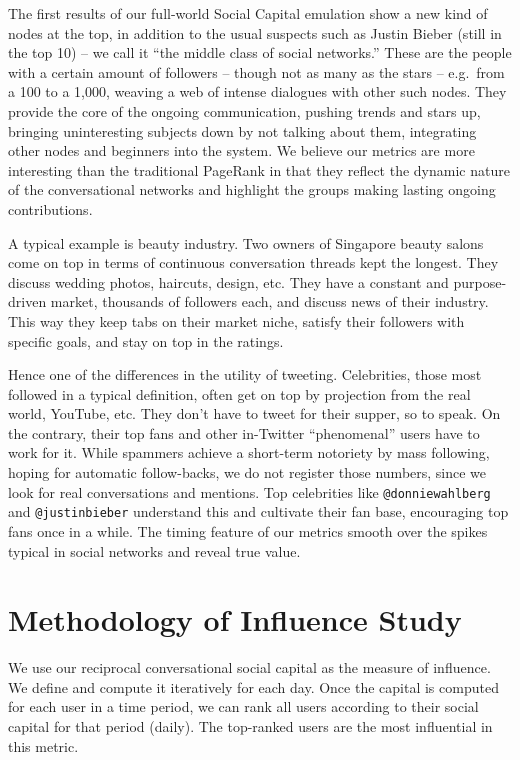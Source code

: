 \documentclass[10pt,oneside]{memoir}
\begin{document}
The first results of our full-world Social Capital emulation show a new kind of nodes at the top, in addition to the usual suspects such as Justin Bieber (still in the top 10) -- we call it ``the middle class of social networks.'' These are the people with a certain amount of followers -- though not as many as the stars -- e.g.\ from a 100 to a 1,000, weaving a web of intense dialogues with other such nodes. They provide the core of the ongoing communication, pushing trends and stars up, bringing uninteresting subjects down by not talking about them, integrating other nodes and beginners into the system. We believe our metrics are more interesting than the traditional PageRank in that they reflect the dynamic nature of the conversational networks and highlight the groups making lasting ongoing contributions.


A typical example is beauty industry. Two owners of Singapore beauty salons come on top in terms of continuous conversation threads kept the longest. They discuss wedding photos, haircuts, design, etc. They have a constant and purpose-driven market, thousands of followers each, and discuss news of their industry. This way they keep tabs on their market niche, satisfy their followers with specific goals, and stay on top in the ratings.


Hence one of the differences in the utility of tweeting. Celebrities, those most followed in a typical definition, often get on top by projection from the real world, YouTube, etc. They don't have to tweet for their supper, so to speak. On the contrary, their top fans and other in-Twitter ``phenomenal'' users have to work for it. While spammers achieve a short-term notoriety by mass following, hoping for automatic follow-backs, we do not register those numbers, since we look for real conversations and mentions. Top celebrities like \texttt{@donniewahlberg} and \texttt{@justinbieber} understand this and cultivate their fan base, encouraging top fans once in a while. The timing feature of our metrics smooth over the spikes typical in social networks and reveal true value.


\pagebreak \section{Methodology of Influence Study}
\label{methodologyofinfluencestudy}

We use our reciprocal conversational social capital as the measure of influence.  We define and compute it iteratively for each day.  Once the capital is computed for each user in a time period,  we can rank all users according to their social capital for that period (daily).  The top-ranked users are the most influential in this metric.
\end{document}
